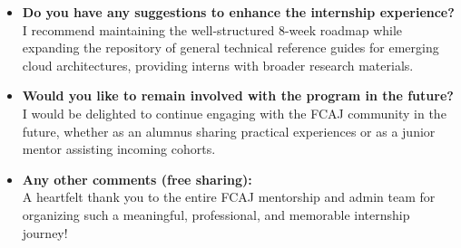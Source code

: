 \begin{itemize}
\item
  \textbf{Do you have any suggestions to enhance the internship
  experience?}\\
  I recommend maintaining the well-structured 8-week roadmap while
  expanding the repository of general technical reference guides for
  emerging cloud architectures, providing interns with broader research
  materials.
\item
  \textbf{Would you like to remain involved with the program in the
  future?}\\
  I would be delighted to continue engaging with the FCAJ community in
  the future, whether as an alumnus sharing practical experiences or as
  a junior mentor assisting incoming cohorts.
\item
  \textbf{Any other comments (free sharing):}\\
  A heartfelt thank you to the entire FCAJ mentorship and admin team for
  organizing such a meaningful, professional, and memorable internship
  journey!
\end{itemize}
